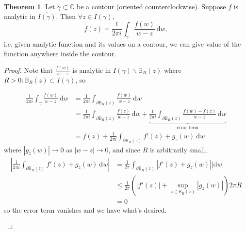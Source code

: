 \documentclass[a4paper]{article}
\theoremstyle{definition}
\newtheorem{thm}[defn]{Theorem}
\begin{document}
\begin{thm}
Let $\gamma \subset \mathbb C$ be a contour (oriented counterclockwise). Suppose $f$ is analytic in $\overline{I(\gamma)}$. Then $\forall z\in I(\gamma)$,
\[
f(z) = \frac{1}{2\pi i} \int_\gamma \frac{f(w)}{w-z} \ \mathrm d w,
\]
i.e. given analytic function and its values on a contour, we can give value of the function anywhere inside the contour.
\end{thm}
\begin{proof}
Note that $\displaystyle \frac{f(w)}{w-z}$ is analytic in $I(\gamma)\backslash \mathbb B_R(z)$ where $R>0:\mathbb B_R(z) \subset I(\gamma)$, so

\[
\begin{aligned}
\frac{1}{2\pi i} \int_\gamma \frac{f(w)}{w-z} \ \mathrm d w&=\frac{1}{2\pi i} \int_{\partial \mathbb B_R(z)} \frac{f(w)}{w-z} \ \mathrm d w \\ &= \frac{1}{2\pi i} \int_{\partial \mathbb B_R(z)} \frac{f(z)}{w-z} \ \mathrm d w+\underbrace{\frac{1}{2\pi i} \int_{\partial \mathbb B_R(z)} \frac{f(w)-f(z)}{w-z} \ \mathrm d w}_{\text{error term}} \\&= f(z)+\frac{1}{2\pi i} \int_{\partial \mathbb B_R(z)} f'(z) +g_z(w) \ \mathrm d w
\end{aligned}
\]
where $|g_z(w)| \rightarrow 0$ as $|w-z|\rightarrow 0$, and since $R$ is arbitrarily small, 
\[
\begin{aligned}
\left|\frac{1}{2\pi i} \int_{\partial \mathbb B_R(z)} f'(z) +g_z(w) \ \mathrm d w\right| &= \frac{1}{2\pi} \int_{\partial \mathbb B_R(z)} |f'(z) + g_z(w) | |\mathrm d w| \\ &\leq \frac{1}{2\pi} \left( |f'(z)|+\underset{z\in \mathbb B_R(z)}{\sup} |g_z(w)| \right) 2\pi R \\&=0
\end{aligned}
\]
so the error term vanishes and we have what's desired.
\begin{center}
\end{center}
\end{proof}
\end{document}
